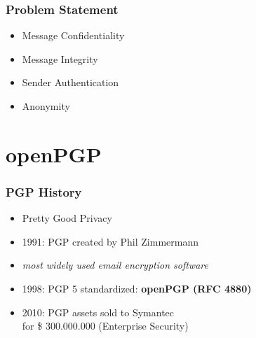 \documentclass{beamer}
\begin{document}

%	
%


\begin{frame}
	\frametitle{Problem Statement}

	\begin{itemize}
		\item Message Confidentiality
		\item Message Integrity
		\item Sender Authentication
		\item Anonymity
	\end{itemize}

\end{frame}

\section{openPGP}


\begin{frame}
	\frametitle{PGP History}

	\begin{itemize}
		\item Pretty Good Privacy
		\item 1991: PGP created by Phil Zimmermann 
		\item \textit{most widely used email encryption software} \cite{zimmermann}
		\item 1998: PGP 5 standardized: \textbf{openPGP (RFC 4880)}
		\item 2010: PGP assets sold to Symantec \\ for \$ 300.000.000 (Enterprise Security)
	\end{itemize}
	

\end{frame}
\end{document}
